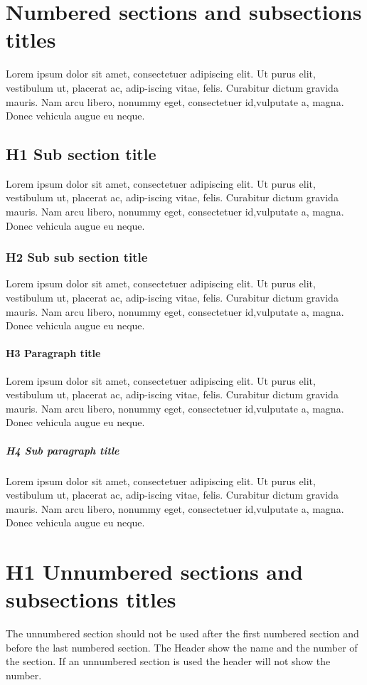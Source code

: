 \documentclass[Theme1]{{template_material/eurostat}}
\begin{document}
\section{Numbered sections and subsections titles}
Lorem ipsum dolor sit amet, consectetuer adipiscing elit. Ut purus elit, vestibulum ut, placerat ac, adip-iscing vitae, felis. Curabitur dictum gravida mauris. Nam arcu libero, nonummy eget, consectetuer id,vulputate a, magna. Donec vehicula augue eu neque.
\subsection{H1 Sub section title}
Lorem ipsum dolor sit amet, consectetuer adipiscing elit. Ut purus elit, vestibulum ut, placerat ac, adip-iscing vitae, felis. Curabitur dictum gravida mauris. Nam arcu libero, nonummy eget, consectetuer id,vulputate a, magna. Donec vehicula augue eu neque.
\subsubsection{H2 Sub sub section title}
Lorem ipsum dolor sit amet, consectetuer adipiscing elit. Ut purus elit, vestibulum ut, placerat ac, adip-iscing vitae, felis. Curabitur dictum gravida mauris. Nam arcu libero, nonummy eget, consectetuer id,vulputate a, magna. Donec vehicula augue eu neque.
\paragraph{H3 Paragraph title}
Lorem ipsum dolor sit amet, consectetuer adipiscing elit. Ut purus elit, vestibulum ut, placerat ac, adip-iscing vitae, felis. Curabitur dictum gravida mauris. Nam arcu libero, nonummy eget, consectetuer id,vulputate a, magna. Donec vehicula augue eu neque.
\subparagraph{H4 Sub paragraph title}
Lorem ipsum dolor sit amet, consectetuer adipiscing elit. Ut purus elit, vestibulum ut, placerat ac, adip-iscing vitae, felis. Curabitur dictum gravida mauris. Nam arcu libero, nonummy eget, consectetuer id,vulputate a, magna. Donec vehicula augue eu neque.
\newpage %

\section*{H1 Unnumbered sections and subsections titles}

The unnumbered section should not be used after the first numbered section and before the last numbered section. The Header show the name and the number of the section. If an unnumbered section is used the header will not show the number. 
\end{document}
